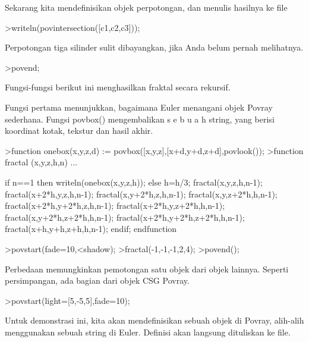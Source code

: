 \documentclass{article}
\begin{document}
\begin{eulernotebook}
\begin{eulercomment}
\begin{eulercomment}
\begin{euleroutput}
\end{euleroutput}
\begin{eulercomment}
Sekarang kita mendefinisikan objek perpotongan, dan menulis hasilnya
ke file
\end{eulercomment}
\begin{eulerprompt}
>writeln(povintersection([c1,c2,c3]));
\end{eulerprompt}
\begin{eulercomment}
Perpotongan tiga silinder sulit dibayangkan, jika Anda belum pernah
melihatnya.
\end{eulercomment}
\begin{eulerprompt}
>povend;
\end{eulerprompt}
\begin{eulercomment}
Fungsi-fungsi berikut ini menghasilkan fraktal secara rekursif.

Fungsi pertama menunjukkan, bagaimana Euler menangani objek Povray
sederhana. Fungsi povbox() mengembalikan s e b u a h string, yang
berisi koordinat kotak, tekstur dan hasil akhir.

\end{eulercomment}
\begin{eulerprompt}
>function onebox(x,y,z,d) := povbox([x,y,z],[x+d,y+d,z+d],povlook());
>function fractal (x,y,z,h,n) ...
\end{eulerprompt}
\begin{eulerudf}
   if n==1 then writeln(onebox(x,y,z,h));
   else
     h=h/3;
     fractal(x,y,z,h,n-1);
     fractal(x+2*h,y,z,h,n-1);
     fractal(x,y+2*h,z,h,n-1);
     fractal(x,y,z+2*h,h,n-1);
     fractal(x+2*h,y+2*h,z,h,n-1);
     fractal(x+2*h,y,z+2*h,h,n-1);
     fractal(x,y+2*h,z+2*h,h,n-1);
     fractal(x+2*h,y+2*h,z+2*h,h,n-1);
     fractal(x+h,y+h,z+h,h,n-1);
   endif;
  endfunction
\end{eulerudf}
\begin{eulerprompt}
>povstart(fade=10,<shadow);
>fractal(-1,-1,-1,2,4);
>povend();
\end{eulerprompt}
\begin{eulercomment}
Perbedaan memungkinkan pemotongan satu objek dari objek lainnya.
Seperti persimpangan, ada bagian dari objek CSG Povray.
\end{eulercomment}
\begin{eulerprompt}
>povstart(light=[5,-5,5],fade=10);
\end{eulerprompt}
\begin{eulercomment}
Untuk demonstrasi ini, kita akan mendefinisikan sebuah objek di
Povray, alih-alih menggunakan sebuah string di Euler. Definisi akan
langsung dituliskan ke file.


\end{eulercomment}
\end{eulercomment}
\end{eulercomment}
\end{eulernotebook}
\end{document}
